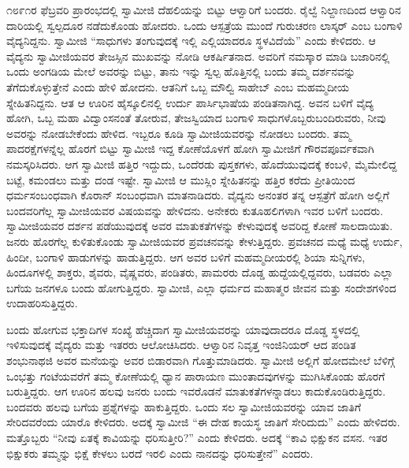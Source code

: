  ೧೮೯೧ರ ಫೆಬ್ರವರಿ ಪ್ರಾರಂಭದಲ್ಲಿ ಸ್ವಾಮೀಜಿ ದೆಹಲಿಯನ್ನು ಬಿಟ್ಟು ಆಳ್ವಾರಿಗೆ ಬಂದರು. ರೈಲ್ವೆ ನಿಲ್ದಾಣದಿಂದ ಆಳ್ವಾರಿನ ದಾರಿಯಲ್ಲಿ ಸ್ವಲ್ಪದೂರ ನಡೆದುಕೊಂಡು ಹೋದರು. ಒಂದು ಆಸ್ಪತ್ರೆಯ ಮುಂದೆ ಗುರುಚರಣ ಲಾಸ್ಕರ್ ಎಂಬ ಬಂಗಾಳಿ ವೈದ್ಯನಿದ್ದನು. ಸ್ವಾಮೀಜಿ “ಸಾಧುಗಳು ತಂಗುವುದಕ್ಕೆ ಇಲ್ಲಿ ಎಲ್ಲಿಯಾದರೂ ಸ್ಥಳವಿದೆಯೆ” ಎಂದು ಕೇಳಿದರು. ಆ ವೈದ್ಯನು ಸ್ವಾಮೀಜಿಯವರ ತೇಜಸ್ಸಿನ ಮುಖವನ್ನು ನೋಡಿ ಆಕರ್ಷಿತನಾದ. ಅವರಿಗೆ ನಮಸ್ಕಾರ ಮಾಡಿ ಬಜಾರಿನಲ್ಲಿ ಒಂದು ಅಂಗಡಿಯ ಮೇಲೆ ಅವರನ್ನು ಬಿಟ್ಟು, ತಾನು ಇನ್ನು ಸ್ವಲ್ಪ ಹೊತ್ತಿನಲ್ಲಿ ಬಂದು ತಮ್ಮ ದರ್ಶನವನ್ನು ತೆಗೆದುಕೊಳ್ಳುತ್ತೇನೆ ಎಂದು ಹೇಳಿ ಹೋದನು. ಆತನಿಗೆ ಒಬ್ಬ ಮೌಲ್ವಿ ಸಾಹೇಬ್ ಎಂಬ ಮಹಮ್ಮದೀಯ ಸ್ನೇಹಿತನಿದ್ದನು. ಆತ ಆ ಊರಿನ ಹೈಸ್ಕೂಲಿನಲ್ಲಿ ಉರ್ದು ಪಾರ್ಸಿಭಾಷೆಯ ಪಂಡಿತನಾಗಿದ್ದ. ಅವನ ಬಳಿಗೆ ವೈದ್ಯ ಹೋಗಿ, ಒಬ್ಬ ಮಹಾ ವಿದ್ವಾಂಸನಂತೆ ತೋರುವ, ತೇಜಸ್ವಿಯಾದ ಬಂಗಾಳಿ ಸಾಧುಗಳೊಬ್ಬರು\break ಬಂದಿರುವರು, ನೀವು ಅವರನ್ನು ನೋಡಬೇಕೆಂದು ಹೇಳಿದ. ಇಬ್ಬರೂ ಕೂಡಿ ಸ್ವಾಮೀಜಿಯವರನ್ನು ನೋಡಲು ಬಂದರು. ತಮ್ಮ ಪಾದರಕ್ಷೆಗಳನ್ನೆಲ್ಲ ಹೊರಗೆ ಬಿಟ್ಟು ಸ್ವಾಮೀಜಿ ಇದ್ದ ಕೋಣೆಯೊಳಗೆ ಹೋಗಿ ಸ್ವಾಮೀಜಿಗೆ ಗೌರವಪೂರ್ವಕವಾಗಿ ನಮಸ್ಕರಿಸಿದರು. ಆಗ ಸ್ವಾಮೀಜಿ ಹತ್ತಿರ ಇದ್ದುದು, ಒಂದೆರಡು ಪುಸ್ತಕಗಳು, ಹೊದೆಯುವುದಕ್ಕೆ ಕಂಬಳಿ, ಮೈಮೇಲಿದ್ದ ಬಟ್ಟೆ, ಕಮಂಡಲು ಮತ್ತು ದಂಡ ಇಷ್ಟೇ. ಸ್ವಾಮೀಜಿ ಆ ಮುಸ್ಲಿಂ ಸ್ನೇಹಿತನನ್ನು ಹತ್ತಿರ ಕರೆದು ಪ್ರೀತಿಯಿಂದ ಧರ್ಮಸಂಬಂಧವಾಗಿ ಕೊರಾನ್ ಸಂಬಂಧವಾಗಿ ಮಾತನಾಡಿದರು. ವೈದ್ಯನು ಅನಂತರ ತನ್ನ ಆಸ್ಪತ್ರೆಗೆ ಹೋಗಿ ಅಲ್ಲಿಗೆ ಬಂದವರಿಗೆಲ್ಲ ಸ್ವಾಮೀಜಿಯವರ ವಿಷಯವನ್ನು ಹೇಳಿದನು. ಅನೇಕರು ಕುತೂಹಲಿಗಳಾಗಿ ಇವರ ಬಳಿಗೆ ಬಂದರು. ಸ್ವಾಮೀಜಿಯವರ ದರ್ಶನ ಪಡೆಯುವುದಕ್ಕೆ ಅವರ ಮಾತುಕತೆಗಳನ್ನು ಕೇಳುವುದಕ್ಕೆ ಅವರಿದ್ದ ಕೋಣೆ ಸಾಲದಾಯಿತು. ಜನರು ಹೊರಗೆಲ್ಲ ಕುಳಿತುಕೊಂಡು ಸ್ವಾಮೀಜಿಯವರ ಪ್ರವಚನವನ್ನು ಕೇಳುತ್ತಿದ್ದರು. ಪ್ರವಚನದ ಮಧ್ಯೆ ಮಧ್ಯೆ ಉರ್ದು, ಹಿಂದೀ, ಬಂಗಾಳಿ ಹಾಡುಗಳನ್ನು ಹಾಡುತ್ತಿದ್ದರು. ಆಗ ಅವರ ಬಳಿಗೆ ಮಹಮ್ಮದೀಯರಲ್ಲಿ ಶಿಯಾ ಸುನ್ನಿಗಳು, ಹಿಂದೂಗಳಲ್ಲಿ ಶಾಕ್ತರು, ಶೈವರು, ವೈಷ್ಣವರು, ಪಂಡಿತರು, ಪಾಮರರು ದೊಡ್ಡ ಹುದ್ದೆಯಲ್ಲಿದ್ದವರು, ಬಡವರು ಎಲ್ಲಾ ಬಗೆಯ ಜನಗಳೂ ಬಂದು ಹೋಗುತ್ತಿದ್ದರು. ಸ್ವಾಮೀಜಿ, ಎಲ್ಲಾ ಧರ್ಮದ ಮಹಾತ್ಮರ ಜೀವನ ಮತ್ತು ಸಂದೇಶಗಳಿಂದ ಉದಾಹರಿಸುತ್ತಿದ್ದರು. 

 ಬಂದು ಹೋಗುವ ಭಕ್ತಾದಿಗಳ ಸಂಖ್ಯೆ ಹೆಚ್ಚಿದಾಗ ಸ್ವಾಮೀಜಿಯವರನ್ನು ಯಾವುದಾದರೂ ದೊಡ್ಡ ಸ್ಥಳದಲ್ಲಿ ಇಳಿಸುವುದಕ್ಕೆ ವೈದ್ಯರು ಮತ್ತು ಇತರರು ಆಲೋಚಿಸಿದರು. ಆಳ್ವಾರಿನ ನಿವೃತ್ತ ಇಂಜಿನಿಯರ್ ಆದ ಪಂಡಿತ ಶಂಭುನಾಥಜಿ ಅವರ ಮನೆಯನ್ನು ಅವರ ಬಿಡಾರವಾಗಿ ಗೊತ್ತುಮಾಡಿದರು. ಸ್ವಾಮೀಜಿ ಅಲ್ಲಿಗೆ ಹೋದಮೇಲೆ ಬೆಳಿಗ್ಗೆ ಒಂಭತ್ತು ಗಂಟೆಯವರೆಗೆ ತಮ್ಮ ಕೋಣೆಯಲ್ಲಿ ಧ್ಯಾನ ಪಾರಾಯಣ ಮುಂತಾದವುಗಳನ್ನು ಮುಗಿಸಿಕೊಂಡು ಹೊರಗೆ ಬರುತ್ತಿದ್ದರು. ಆಗ ಊರಿನ ಹಲವು ಜನರು ಬಂದು ಇವರೊಡನೆ ಮಾತುಕತೆಗಳನ್ನಾಡಲು ಕಾದುಕೊಂಡಿರುತ್ತಿದ್ದರು. ಬಂದವರು ಹಲವು ಬಗೆಯ ಪ್ರಶ್ನೆಗಳನ್ನು ಹಾಕುತ್ತಿದ್ದರು. ಒಂದು ಸಲ ಸ್ವಾಮೀಜಿಯವರನ್ನು ಯಾವ ಜಾತಿಗೆ ಸೇರಿದವರೆಂದು ಯಾರೊ ಕೇಳಿದರು. ಅದಕ್ಕೆ ಸ್ವಾಮೀಜಿ “ಈ ದೇಹ ಕಾಯಸ್ಥ ಜಾತಿಗೆ ಸೇರಿದುದು” ಎಂದು ಹೇಳಿದರು. ಮತ್ತೊಬ್ಬರು “ನೀವು ಏತಕ್ಕೆ ಕಾವಿಯನ್ನು ಧರಿಸುತ್ತೀರಿ?” ಎಂದು ಕೇಳಿದರು. ಅದಕ್ಕೆ “ಕಾವಿ ಭಿಕ್ಷುಕನ ವಸನ. ಇತರ ಭಿಕ್ಷುಕರು ತಮ್ಮನ್ನು ಭಿಕ್ಷೆ ಕೇಳಲು ಬರದೆ ಇರಲಿ ಎಂದು ನಾನದನ್ನು ಧರಿಸುತ್ತೇನೆ” ಎಂದರು. 

